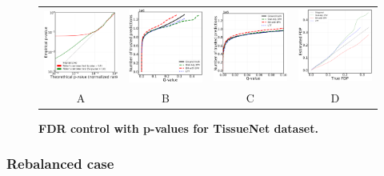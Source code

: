 \documentclass{article}
\begin{document}
\begin{figure}
	\centering
	\begin{tabular}{cccc}
 		\includegraphics[width=1.7in]{img/cnn_QQ_cells_segment_TA_log.png} &
		\includegraphics[width=1.7in]{img/cnn_cells_segment_TA_fdr_control.png} & 
            \includegraphics[width=1.7in]{img/cnn_cells_segment_TA_fdr_control_loc.png}
            & 
            \includegraphics[width=1.7in]{img/cnn_FDPscat_cells_segment_TA.png}
		\\	
		A & B & C & D
	\end{tabular}
	\caption{\bf FDR control with p-values for TissueNet dataset.}
	\label{fig:pcam}
\end{figure}

\subsubsection{Rebalanced case}
\end{document}
